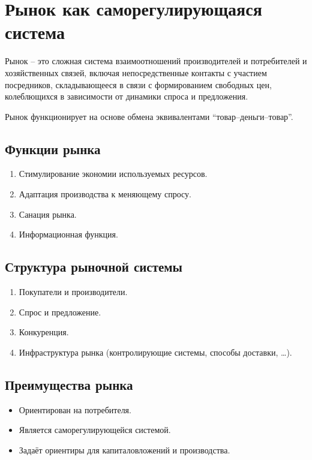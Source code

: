 \section{Рынок как саморегулирующаяся система}

Рынок -- это сложная система взаимоотношений производителей и потребителей и
хозяйственных связей, включая непосредственные контакты с участием посредников,
складывающееся в связи с формированием свободных цен, колеблющихся в зависимости
от динамики спроса и предложения.

Рынок функционирует на основе обмена эквивалентами ``товар--деньги--товар''.

\subsection{Функции рынка}
\begin{enumerate}
    \item Стимулирование экономии используемых ресурсов.
    \item Адаптация производства к меняющему спросу.
    \item Санация рынка.
    \item Информационная функция.
\end{enumerate}

\subsection{Структура рыночной системы}
\begin{enumerate}
    \item Покупатели и производители.
    \item Спрос и предложение.
    \item Конкуренция.
    \item Инфраструктура рынка (контролирующие системы, способы доставки, \ldots).
\end{enumerate}

\subsection{Преимущества рынка}
\begin{itemize}
    \item Ориентирован на потребителя.
    \item Является саморегулирующейся системой.
    \item Задаёт ориентиры для капиталовложений и производства.
\end{itemize}

